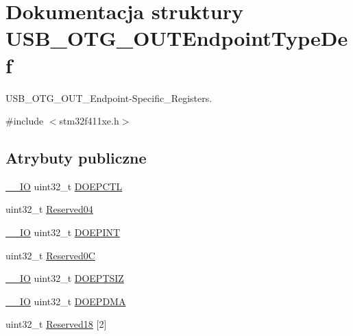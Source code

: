 \hypertarget{struct_u_s_b___o_t_g___o_u_t_endpoint_type_def}{}\section{Dokumentacja struktury U\+S\+B\+\_\+\+O\+T\+G\+\_\+\+O\+U\+T\+Endpoint\+Type\+Def}
\label{struct_u_s_b___o_t_g___o_u_t_endpoint_type_def}


U\+S\+B\+\_\+\+O\+T\+G\+\_\+\+O\+U\+T\+\_\+\+Endpoint-\/\+Specific\+\_\+\+Registers.  




{\ttfamily \#include $<$stm32f411xe.\+h$>$}

\subsection*{Atrybuty publiczne}
\begin{DoxyCompactItemize}
\item 
\hyperlink{core__sc300_8h_aec43007d9998a0a0e01faede4133d6be}{\+\_\+\+\_\+\+IO} uint32\+\_\+t \hyperlink{struct_u_s_b___o_t_g___o_u_t_endpoint_type_def_a86a62895d4b90531c30f5a48f404ddea}{D\+O\+E\+P\+C\+TL}
\item 
uint32\+\_\+t \hyperlink{struct_u_s_b___o_t_g___o_u_t_endpoint_type_def_a76533e00218c269a8064cf68c3daf7e9}{Reserved04}
\item 
\hyperlink{core__sc300_8h_aec43007d9998a0a0e01faede4133d6be}{\+\_\+\+\_\+\+IO} uint32\+\_\+t \hyperlink{struct_u_s_b___o_t_g___o_u_t_endpoint_type_def_a0b8b826828cba51585aabe9b73074d07}{D\+O\+E\+P\+I\+NT}
\item 
uint32\+\_\+t \hyperlink{struct_u_s_b___o_t_g___o_u_t_endpoint_type_def_a1d7bc9b546c4dd8ce2fe792945cf7a9d}{Reserved0C}
\item 
\hyperlink{core__sc300_8h_aec43007d9998a0a0e01faede4133d6be}{\+\_\+\+\_\+\+IO} uint32\+\_\+t \hyperlink{struct_u_s_b___o_t_g___o_u_t_endpoint_type_def_a5e4876bb58a4a01eacf675b69f36df26}{D\+O\+E\+P\+T\+S\+IZ}
\item 
\hyperlink{core__sc300_8h_aec43007d9998a0a0e01faede4133d6be}{\+\_\+\+\_\+\+IO} uint32\+\_\+t \hyperlink{struct_u_s_b___o_t_g___o_u_t_endpoint_type_def_a189d59fa4e34c96ce7eb25c0afd50cd7}{D\+O\+E\+P\+D\+MA}
\item 
uint32\+\_\+t \hyperlink{struct_u_s_b___o_t_g___o_u_t_endpoint_type_def_a51b162457add1bb7cc254b7aeb9f94bd}{Reserved18} \mbox{[}2\mbox{]}
\end{DoxyCompactItemize}


